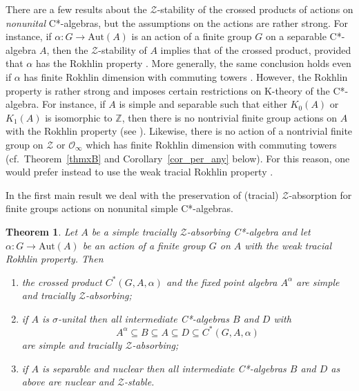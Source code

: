 \documentclass[11pt]{amsart}
\theoremstyle{plain}
\newtheorem{thmx}{Theorem}
\theoremstyle{definition}
\theoremstyle{remark}
\numberwithin{equation}{section}
\begin{document}
\medskip

There are a few results about the $\mathcal{Z}$-stability
of the crossed products of actions on \emph{nonunital}
C*-algebras, but the assumptions on the actions
are rather strong. For instance, if
 $\alpha \colon G \to \mathrm{Aut} (A)$ is an action 
of a finite group $G$ on a separable  C*-algebra $A$,
then the $\mathcal{Z}$-stability
of $A$ implies that of the crossed product, 
provided that $\alpha$ has the Rokhlin property 
\cite[Theorem~3(v)]{San15}. More generally, 
the same conclusion holds even if $\alpha$
has finite Rokhlin dimension with commuting towers 
\cite[Theorem~2.2]{HrsPh1}.
However, the Rokhlin property is rather strong  and imposes
certain restrictions on K-theory of the C*-algebra.
For instance, if $A$ is simple and separable
such that  either $K_0(A)$
or $K_1(A)$ is isomorphic to $\mathbb{Z}$, then there 
is no nontrivial finite group actions
on $A$ with the Rokhlin property 
(see \cite[Corollary~3.10]{Naw2016}). Likewise,
there is no action of a nontrivial finite group  on 
$\mathcal{Z}$ or $\mathcal{O}_\infty$ which has finite 
Rokhlin dimension with commuting towers \cite[Corollary~4.8]{HrsPh1}
(cf.~Theorem~\ref{thmxB} and Corollary~\ref{cor_per_any} below).
For this reason, one would prefer 
instead to use the weak tracial Rokhlin property \cite{FG17}.

In the first main result we deal with 
 the preservation of (tracial) $\mathcal{Z}$-absorption 
for finite groups actions on nonunital simple C*-algebras.  

\begin{thmx}\label{thmxA}
Let $A$ be a simple tracially $\mathcal{Z}$-absorbing C*-algebra
and let $\alpha \colon G \to \mathrm{Aut} (A)$ be an
action of a finite group $G$ on $A$  with the weak tracial Rokhlin
property. Then
\begin{enumerate}
\item\label{thmxA_it1}
the crossed product $C^*(G, A,\alpha)$ and the fixed point
algebra $A^\alpha$ are simple and tracially $\mathcal{Z}$-absorbing;
\item\label{thmxA_it2}
if $A$ is $\sigma$-unital 
then all 
intermediate 
C*-algebras $B$ and $D$ with 
\[
A^{\alpha}  \subseteq B \subseteq A \subseteq D \subseteq C^*(G, A,\alpha)
\]
are   simple and
tracially $\mathcal{Z}$-absorbing;

\item\label{thmxA_it3}
if $A$ is separable and nuclear then all intermediate
C*-algebras $B$ and $D$ as above are nuclear and $\mathcal{Z}$-stable.
\end{enumerate}
\end{thmx}
\end{document}
